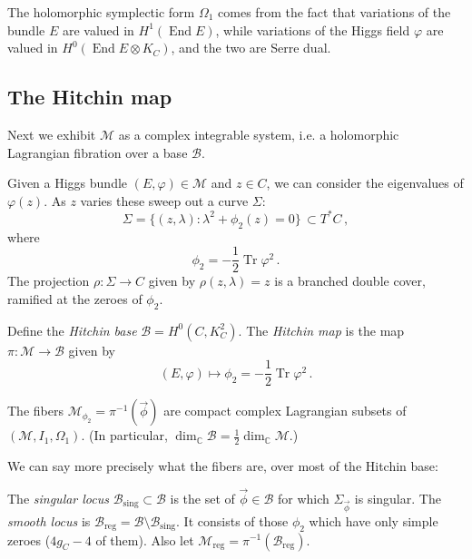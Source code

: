 \documentclass[12pt,letterpaper,reqno]{article}
\numberwithin{equation}{section}
\begin{document}
The holomorphic symplectic form $\Omega_1$ comes from the fact 
that variations of the bundle $E$ are valued in $H^1(\operatorname{End} E)$,
while variations of the Higgs field $\varphi$ are
valued in $H^0(\operatorname{End} E \otimes K_C)$,
and the two are Serre dual.

\subsection{The Hitchin map}

Next we exhibit $\mathcal M$ as a complex integrable system,
i.e. a holomorphic Lagrangian fibration over a base 
$\mathcal B$.

Given a Higgs bundle $(E,\varphi) \in \mathcal M$ and $z \in C$,
we can consider the eigenvalues of $\varphi(z)$. As $z$ varies
these sweep out a curve $\Sigma$:
\begin{equation}
  \Sigma = \{ (z,\lambda): \lambda^2 + \phi_2(z) = 0\} \, \subset T^*C \, ,
\end{equation}
where
\begin{equation}
  \phi_2 = - \frac12 \operatorname{Tr} \varphi^2 \, .
\end{equation}
The projection $\rho: \Sigma \to C$ given by $\rho(z,\lambda) = z$ is a branched double cover,
ramified at the zeroes of $\phi_2$.

\begin{defn}
Define the \textit{Hitchin base} $\mathcal B = H^0(C, K_C^2)$.
The \textit{Hitchin map} is the map $\pi: \mathcal M \to \mathcal B$ given by
\begin{equation}
  (E, \varphi) \mapsto \phi_2 = - \frac12 \operatorname{Tr} \varphi^2 \, .
\end{equation}
\end{defn}

\begin{prop} The fibers
$\mathcal M_{\phi_2} = \pi^{-1}(\vec\phi)$ 
are compact complex Lagrangian subsets of $(\mathcal M, I_1, \Omega_1)$. (In particular, $\dim_\mathbb C \mathcal B = \frac{1}{2} \dim_\mathbb C \mathcal M$.)
\end{prop}

We can say more precisely what the fibers are,
over most of the Hitchin base:

\begin{defn}
The \textit{singular locus} $\mathcal B_\mathrm{sing} \subset \mathcal B$ is the set of $\vec\phi \in \mathcal B$
for which $\Sigma_{\vec \phi}$ is singular.
The \textit{smooth locus} is $\mathcal B_\mathrm{reg} = \mathcal B \setminus \mathcal B_\mathrm{sing}$.
It consists of those $\phi_2$ which have only simple zeroes ($4 g_C - 4$ of them).
Also let $\mathcal M_\mathrm{reg} = \pi^{-1}(\mathcal B_\mathrm{reg})$.
\end{defn}
\end{document}
